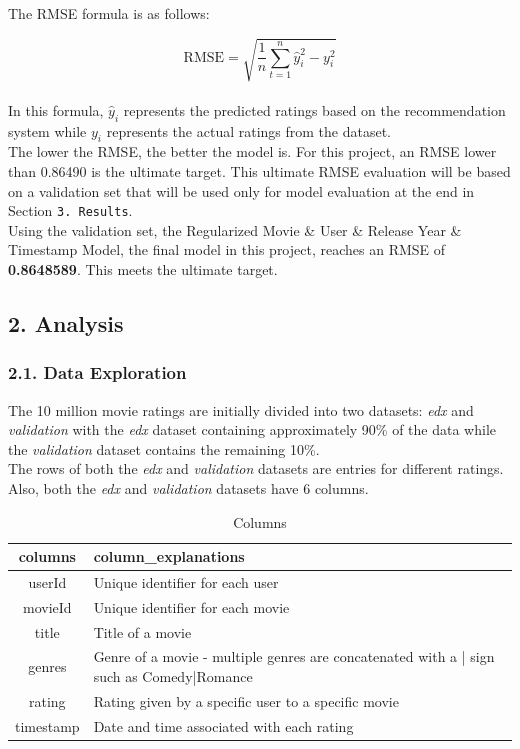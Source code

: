 \documentclass[
]{article}
\begin{document}
The RMSE formula is as follows:

\[\mbox{RMSE} = \sqrt{\frac{1}{n}\sum_{t=1}^{n}\hat{y}_i^2-y_i^2}\]\\
In this formula, \(\hat{y}_i\) represents the predicted ratings based on
the recommendation system while \(y_i\) represents the actual ratings
from the dataset.\\
The lower the RMSE, the better the model is. For this project, an RMSE
lower than 0.86490 is the ultimate target. This ultimate RMSE evaluation
will be based on a validation set that will be used only for model
evaluation at the end in Section \texttt{3.\ Results}.\\
Using the validation set, the Regularized Movie \& User \& Release Year
\& Timestamp Model, the final model in this project, reaches an RMSE of
\textbf{0.8648589}. This meets the ultimate target.

\hypertarget{analysis}{%
\subsection{2. Analysis}\label{analysis}}

\hypertarget{data-exploration}{%
\subsubsection{2.1. Data Exploration}\label{data-exploration}}

The 10 million movie ratings are initially divided into two datasets:
\emph{edx} and \emph{validation} with the \emph{edx} dataset containing
approximately 90\% of the data while the \emph{validation} dataset
contains the remaining 10\%.\\
The rows of both the \emph{edx} and \emph{validation} datasets are
entries for different ratings.\\
Also, both the \emph{edx} and \emph{validation} datasets have 6
columns.\\

\begin{table}[H]

\caption{\label{tab:Table 1: Columns names with explanation}Columns}
\centering
\fontsize{11}{13}\selectfont
\begin{tabular}[t]{|>{}c|||>{}l|}
\hline
columns & column\_explanations\\
\hline
userId & Unique identifier for each user\\
\hline
movieId & Unique identifier for each movie\\
\hline
title & Title of a movie\\
\hline
genres & Genre of a movie - multiple genres are concatenated with a | sign such as Comedy|Romance\\
\hline
rating & Rating given by a specific user to a specific movie\\
\hline
timestamp & Date and time associated with each rating\\
\hline
\end{tabular}
\end{table}
\end{document}
